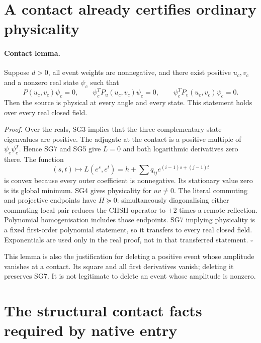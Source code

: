 \section{A contact already certifies ordinary physicality}

\paragraph{Contact lemma.}
Suppose $d>0$, all event weights are nonnegative, and there exist
positive $u_c,v_c$ and a nonzero real state $\psi_c$ such that
\[
 P(u_c,v_c)\psi_c=0,
 \qquad\psi_c^TP_u(u_c,v_c)\psi_c=0,
 \qquad\psi_c^TP_v(u_c,v_c)\psi_c=0.                    \tag{SG7}
\]
Then the source is physical at every angle and every state.  This
statement holds over every real closed field.

\emph{Proof.}
Over the reals, SG3 implies that the three complementary state
eigenvalues are positive.  The adjugate at the contact is a positive
multiple of $\psi_c\psi_c^T$.  Hence SG7 and SG5 give $L=0$ and both
logarithmic derivatives zero there.  The function
\[
 (s,t)\longmapsto L(e^s,e^t)
       =h+\sum q_{ij}e^{(i-1)s+(j-1)t}
\]
is convex because every outer coefficient is nonnegative.  Its
stationary value zero is its global minimum.  SG4 gives physicality
for $uv\ne0$.  The literal commuting and projective endpoints have
$H\succeq0$: simultaneously diagonalising either commuting local
pair reduces the CHSH operator to $\pm2$ times a remote reflection.
Polynomial homogenisation includes those endpoints.  SG7 implying
physicality is a fixed first-order polynomial statement, so it
transfers to every real closed field.  Exponentials are used only in
the real proof, not in that transferred statement. \hfill$\square$

This lemma is also the justification for deleting a positive event
whose amplitude vanishes at a contact.  Its square and all first
derivatives vanish; deleting it preserves SG7.  It is not legitimate
to delete an event whose amplitude is nonzero.

\section{The structural contact facts required by native entry}

